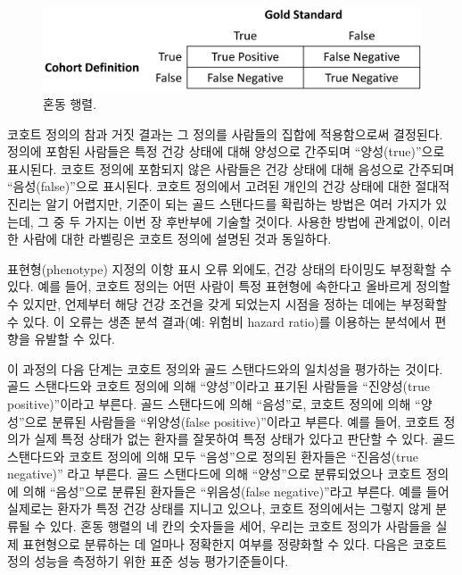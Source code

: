 \documentclass[11pt]{book}
\theoremstyle{definition}
\theoremstyle{definition}
\theoremstyle{definition}
\theoremstyle{remark}
\begin{document}
\begin{figure}

{\centering \includegraphics[width=0.75\linewidth]{images/ClinicalValidity/matrix} 

}

\caption{혼동 행렬.}\label{fig:matrix}
\end{figure}

코호트 정의의 참과 거짓 결과는 그 정의를 사람들의 집합에 적용함으로써
결정된다. 정의에 포함된 사람들은 특정 건강 상태에 대해 양성으로 간주되며
``양성(true)''으로 표시된다. 코호트 정의에 포함되지 않은 사람들은 건강
상태에 대해 음성으로 간주되며 ``음성(false)''으로 표시된다. 코호트
정의에서 고려된 개인의 건강 상태에 대한 절대적 진리는 알기 어렵지만,
기준이 되는 골드 스탠다드를 확립하는 방법은 여러 가지가 있는데, 그 중 두
가지는 이번 장 후반부에 기술할 것이다. 사용한 방법에 관계없이, 이러한
사람에 대한 라벨링은 코호트 정의에 설명된 것과 동일하다.

표현형(phenotype) 지정의 이항 표시 오류 외에도, 건강 상태의 타이밍도
부정확할 수 있다. 예를 들어, 코호트 정의는 어떤 사람이 특정 표현형에
속한다고 올바르게 정의할 수 있지만, 언제부터 해당 건강 조건을 갖게
되었는지 시점을 정하는 데에는 부정확할 수 있다. 이 오류는 생존 분석
결과(예: 위험비 hazard ratio)를 이용하는 분석에서 편향을 유발할 수 있다.

이 과정의 다음 단계는 코호트 정의와 골드 스탠다드와의 일치성을 평가하는
것이다. 골드 스탠다드와 코호트 정의에 의해 ``양성''이라고 표기된
사람들을 ``진양성(true positive)''이라고 부른다. 골드 스탠다드에 의해
``음성''로, 코호트 정의에 의해 ``양성''으로 분류된 사람들을
``위양성(false positive)''이라고 부른다. 예를 들어, 코호트 정의가 실제
특정 상태가 없는 환자를 잘못하여 특정 상태가 있다고 판단할 수 있다. 골드
스탠다드와 코호트 정의에 의해 모두 ``음성''으로 정의된 환자들은
``진음성(true negative)'' 라고 부른다. 골드 스탠다드에 의해 ``양성''으로
분류되었으나 코호트 정의에 의해 ``음성''으로 분류된 환자들은
``위음성(false negative)''라고 부른다. 예를 들어 실제로는 환자가 특정
건강 상태를 지니고 있으나, 코호트 정의에서는 그렇지 않게 분류될 수 있다.
혼동 행렬의 네 칸의 숫자들을 세어, 우리는 코호트 정의가 사람들을 실제
표현형으로 분류하는 데 얼마나 정확한지 여부를 정량화할 수 있다. 다음은
코호트 정의 성능을 측정하기 위한 표준 성능 평가기준들이다.
\end{document}
